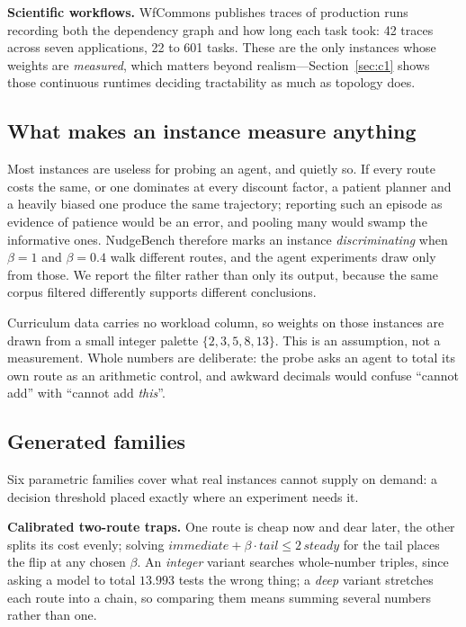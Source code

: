 \documentclass{article}
\begin{document}
\textbf{Scientific workflows.} WfCommons publishes traces of production runs
recording both the dependency graph and how long each task took: 42 traces across
seven applications, 22 to 601 tasks. These are the only instances whose weights are
\emph{measured}, which matters beyond realism---Section~\ref{sec:c1} shows those
continuous runtimes deciding tractability as much as topology does.

\subsection{What makes an instance measure anything}
\label{sec:discriminating}

Most instances are useless for probing an agent, and quietly so. If every route
costs the same, or one dominates at every discount factor, a patient planner and a
heavily biased one produce the same trajectory; reporting such an episode as evidence
of patience would be an error, and pooling many would swamp the informative ones.
NudgeBench therefore marks an instance \emph{discriminating} when $\beta = 1$ and
$\beta = 0.4$ walk different routes, and the agent experiments draw only from those.
We report the filter rather than only its output, because the same corpus filtered
differently supports different conclusions.

Curriculum data carries no workload column, so weights on those instances are drawn
from a small integer palette $\{2,3,5,8,13\}$. This is an assumption, not a
measurement. Whole numbers are deliberate: the probe asks an agent to total its own
route as an arithmetic control, and awkward decimals would confuse ``cannot add''
with ``cannot add \emph{this}''.

\subsection{Generated families}

Six parametric families cover what real instances cannot supply on demand: a
decision threshold placed exactly where an experiment needs it.

\textbf{Calibrated two-route traps.} One route is cheap now and dear later, the
other splits its cost evenly; solving
$\textit{immediate} + \beta \cdot \textit{tail} \le 2\,\textit{steady}$ for the tail
places the flip at any chosen $\beta$. An \emph{integer} variant searches whole-number
triples, since asking a model to total $13.993$ tests the wrong thing; a \emph{deep}
variant stretches each route into a chain, so comparing them means summing several
numbers rather than one.
\end{document}
